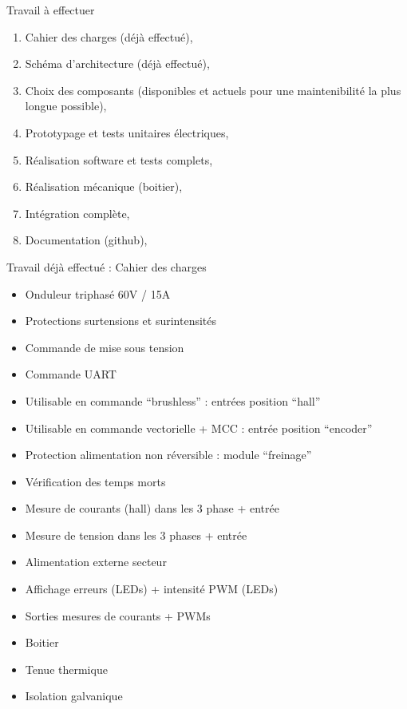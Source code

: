 \documentclass[aspectratio=169]{beamer}
\begin{document}
\begin{frame}{Travail à effectuer}
\begin{enumerate}
	\item Cahier des charges (déjà effectué),
	\item Schéma d'architecture (déjà effectué),
	\item Choix des composants (disponibles et actuels pour une maintenibilité la plus longue possible),
	\item Prototypage et tests unitaires électriques,
	\item Réalisation software et tests complets,
	\item Réalisation mécanique (boitier),
	\item Intégration complète,
	\item Documentation (github),
\end{enumerate}
\end{frame}

\begin{frame}{Travail déjà effectué : Cahier des charges}
\begin{itemize}
	\item Onduleur triphasé 60V / 15A
	\item Protections surtensions et surintensités
	\item Commande de mise sous tension
	\item Commande UART
	\item Utilisable en commande ``brushless'' :  entrées position ``hall'' 
	\item Utilisable en commande vectorielle + MCC : entrée position ``encoder''
	\item Protection alimentation non réversible : module ``freinage''
	\item Vérification des temps morts
	\item Mesure de courants (hall) dans les 3 phase + entrée
	\item Mesure de tension dans les 3 phases + entrée
	\item Alimentation externe secteur
	\item Affichage erreurs (LEDs) + intensité PWM (LEDs)
	\item Sorties mesures de courants + PWMs
	\item Boitier
	\item Tenue thermique
	\item Isolation galvanique
\end{itemize}
\end{frame}
\end{document}
